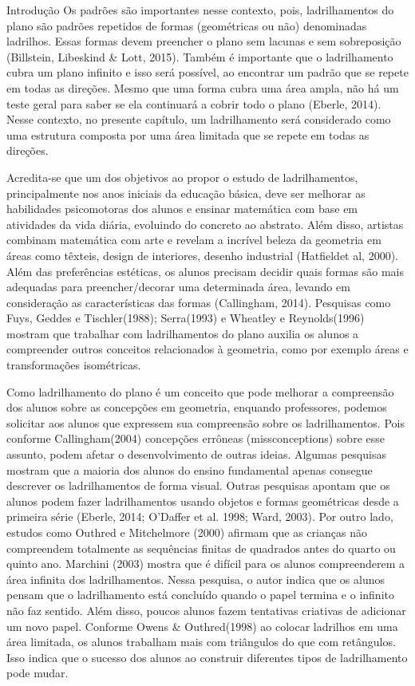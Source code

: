 \begin{apresentacao}{Introdução}
Os padrões são importantes nesse contexto, pois, ladrilhamentos do plano são padrões repetidos de formas (geométricas ou não) denominadas ladrilhos. Essas formas devem preencher o plano sem lacunas e sem sobreposição (Billstein, Libeskind \& Lott, 2015). Também é importante que o ladrilhamento cubra  um plano infinito e isso será  possível, ao encontrar um padrão que se repete em todas as direções. Mesmo que uma forma cubra uma área ampla, não há um teste geral para saber se ela continuará a cobrir todo o plano (Eberle, 2014). Nesse contexto, no  presente capítulo, um ladrilhamento  será considerado como uma estrutura composta por uma área limitada que se repete em todas as direções. 

Acredita-se que um dos  objetivos ao propor o estudo de ladrilhamentos, principalmente nos anos iniciais da educação básica, deve ser melhorar as habilidades psicomotoras dos alunos e ensinar matemática com base em  atividades da vida diária, evoluindo do concreto ao abstrato. Além disso, artistas combinam matemática com arte e revelam a incrível beleza da geometria em áreas como têxteis, design de interiores, desenho industrial (Hatfieldet al, 2000). Além das preferências estéticas, os alunos precisam decidir quais formas são mais adequadas para preencher/decorar uma determinada área, levando em consideração as características das formas (Callingham, 2014). Pesquisas como Fuys, Geddes e Tischler(1988); Serra(1993) e  Wheatley e Reynolds(1996) mostram que trabalhar com ladrilhamentos do plano auxilia os alunos a compreender outros conceitos relacionados à geometria, como por exemplo áreas e transformações isométricas.  

Como ladrilhamento do plano é um conceito que pode melhorar a compreensão dos alunos sobre as concepções em geometria,  enquando professores, podemos  solicitar aos alunos que expressem sua compreensão sobre os ladrilhamentos. Pois conforme Callingham(2004) concepções errôneas (missconceptions)  sobre esse assunto, podem afetar o desenvolvimento de outras ideias. Algumas pesquisas mostram que a maioria dos alunos do ensino fundamental apenas consegue descrever os ladrilhamentos de forma visual. Outras pesquisas apontam que os alunos podem fazer ladrilhamentos  usando objetos e formas geométricas desde a primeira série (Eberle, 2014; O'Daffer et al. 1998; Ward, 2003). Por outro lado, estudos como Outhred e Mitchelmore (2000) afirmam que as crianças não compreendem totalmente as sequências finitas de quadrados antes do quarto ou quinto ano. Marchini (2003) mostra que é  difícil para os alunos compreenderem a área infinita dos ladrilhamentos. Nessa pesquisa, o autor indica que os alunos pensam que o ladrilhamento está concluído quando o papel termina e o infinito não faz sentido. Além disso,  poucos alunos fazem tentativas criativas de adicionar um novo papel. Conforme Owens \& Outhred(1998) ao colocar ladrilhos em uma área limitada, os alunos trabalham mais com triângulos do que com retângulos. Isso indica que o sucesso dos alunos ao construir diferentes tipos de ladrilhamento  pode mudar.


\end{apresentacao}
